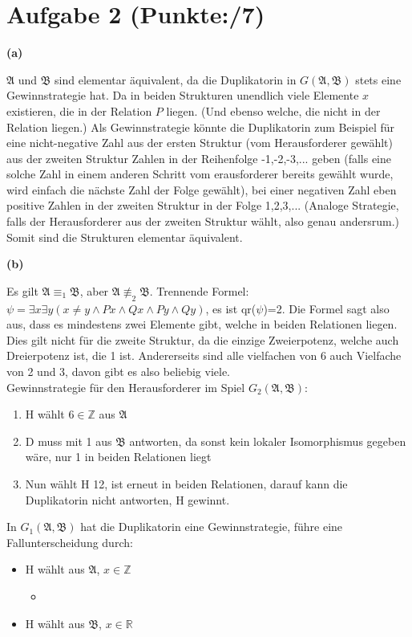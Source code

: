 \documentclass[11pt, a4paper]{article}
\newcommand{\p}{7}
\newcommand{\struc}[1]{\ensuremath{\mathfrak{#1}}}
\begin{document}
\section*{Aufgabe 2 (Punkte:\qquad/\p)}
\textbf{(a)}
\begin{adjustwidth}{20pt}{20pt}
	\struc{A} und \struc{B} sind elementar äquivalent, da die Duplikatorin in $G(\struc{A},\struc{B})$ stets eine Gewinnstrategie hat. Da in beiden Strukturen unendlich viele Elemente $x$
	existieren, die in der Relation $P$ liegen. (Und ebenso welche, die nicht in der Relation liegen.) Als Gewinnstrategie könnte die Duplikatorin zum Beispiel für eine nicht-negative Zahl aus
	der ersten Struktur (vom Herausforderer gewählt) aus der zweiten Struktur Zahlen in der Reihenfolge -1,-2,-3,... geben (falls eine solche Zahl in einem anderen Schritt vom erausforderer bereits gewählt wurde, wird
	einfach die nächste Zahl der Folge gewählt), bei einer negativen Zahl eben positive Zahlen in der zweiten Struktur in der Folge 1,2,3,... (Analoge Strategie, falls der Herausforderer aus
	der zweiten Struktur wählt, also genau andersrum.) Somit sind die Strukturen elementar äquivalent.
	
\end{adjustwidth}
\textbf{(b)}
\begin{adjustwidth}{20pt}{20pt}
	Es gilt $\struc{A} \equiv_1 \struc{B}$, aber $\struc{A} \not\equiv_2 \struc{B}$. Trennende Formel: $\psi = \exists x \exists y(x \neq y \wedge Px \wedge Qx \wedge Py \wedge Qy)$, es ist
	qr($\psi$)=2. Die Formel sagt also aus, dass es mindestens zwei Elemente gibt, welche in beiden Relationen liegen. Dies gilt nicht für die zweite Struktur, da die einzige Zweierpotenz,
	welche auch Dreierpotenz ist, die 1 ist. Andererseits sind alle vielfachen von 6 auch Vielfache von 2 und 3, davon gibt es also beliebig viele.\\
	Gewinnstrategie für den Herausforderer im Spiel $G_2(\struc{A},\struc{B})$:
	\begin{enumerate}
	\item H wählt $6\in\mathbb{Z}$ aus \struc{A}
	\item D muss mit 1 aus \struc{B} antworten, da sonst kein lokaler Isomorphismus gegeben wäre, nur 1 in beiden Relationen liegt
	\item Nun wählt H 12, ist erneut in beiden Relationen, darauf kann die Duplikatorin nicht antworten, H gewinnt.
	\end{enumerate}
	In $G_1(\struc{A},\struc{B})$ hat die Duplikatorin eine Gewinnstrategie, führe eine Fallunterscheidung durch:
	\begin{itemize}
	\item H wählt aus \struc{A}, $x \in \mathbb{Z}$
		\begin{itemize}
		\item 
		\end{itemize}
	\item H wählt aus \struc{B}, $x \in \mathbb{R}$
	\end{itemize}
\end{adjustwidth}
\end{document}
